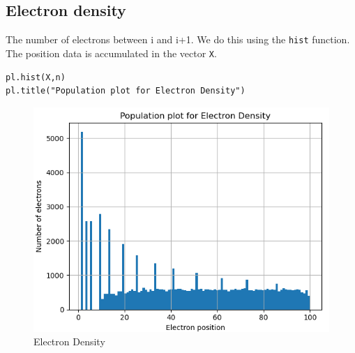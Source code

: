 \documentclass[11pt, a4paper]{article}
\begin{document}
\subsection{Electron density}
    The number of electrons between i and i+1. We do this using the \texttt{hist} function. The position data is accumulated in the vector \texttt{X}.
    \begin{verbatim}
pl.hist(X,n)
pl.title("Population plot for Electron Density")
    \end{verbatim}
    \begin{figure}[!h]
        \centering
        \includegraphics[scale = 0.69]{Figure 1.png}
        \caption{Electron Density}
        \label{fig:my_label}
    \end{figure}
\end{document}
